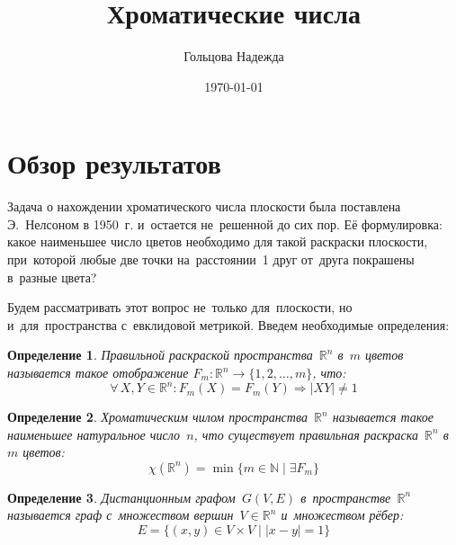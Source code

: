 \documentclass{report}%
\newtheorem{definition}{Определение}
\begin{document}
\frenchspacing
\setcounter{secnumdepth}{-1}
\title{Хроматические числа}
\author{Гольцова Надежда}
\date{\today}
\maketitle

\section{Обзор результатов}

Задача о нахождении хроматического числа плоскости была поставлена             
Э.~Нелсоном в 1950~г. и~остается не~решенной до сих пор. Её формулировка: 
какое наименьшее число цветов необходимо для такой раскраски плоскости, 
при~которой любые две точки на~расстоянии~1 друг от~друга покрашены в~разные
цвета? 

\noindent Будем рассматривать этот вопрос не~только для~плоскости, но и~для~пространства
 с~евклидовой метрикой. Введем необходимые определения:

\begin{definition}
		Правильной раскраской пространства~$\mathbb{R}^n$ в~$m$ цветов называется
		такое отображение $F_m \colon \mathbb{R}^n \rightarrow \{1, 2, \ldots , m \}$, что:
		\begin{equation}
				\forall \, X, Y \in \mathbb{R}^n \colon F_m(X) = F_m(Y) \Rightarrow |XY| \ne 1
		\end{equation}
\end{definition}

\begin{definition}
		Хроматическим чилом пространства~$\mathbb{R}^n$ называется такое наименьшее
		натуральное число~$n$, что существует правильная раскраска~$\mathbb{R}^n$ в~$m$
		цветов:
		\begin{equation}
				\chi(\mathbb{R}^n) = \min \{m \in \mathbb{N} \mid \exists F_m\}
		\end{equation}
\end{definition}

\begin{definition}
		Дистанционным графом~$G(V, E)$ в~пространстве~$\mathbb{R}^n$ называется граф
		с~множеством вершин~$V \in \mathbb{R}^n$ и~множеством рёбер:
		\begin{equation}
				E = \{(x, y) \in V \times V \mid |x - y| = 1 \}
		\end{equation}
\end{definition}
\end{document}
